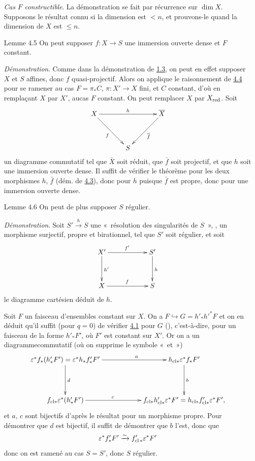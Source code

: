\documentclass[10pt]{../fichiers-configuration-latex/smfart}
\begin{document}
\medskip
\noindent
\emph{Cas $F$ constructible}. La démonstration se fait par récurrence
sur $\dim X$. Supposons le résultat connu si la dimension est $<n$, et
prouvons-le quand la dimension de $X$ est $\leq n$.

\begin{enonce*}{Lemme 4.5}
On peut supposer $f:X\rightarrow S$ une immersion ouverte dense et $F$
constant.
\end{enonce*}

\noindent
\emph{Démonstration}. Comme dans la démonstration de \hyperref[XVI.lem1.3]{1.3}, on peut en
effet supposer $X$ et $S$ affines, donc $f$ quasi-projectif. Alors on
applique le raisonnement de \hyperref[XVI.lem4.4]{4.4} pour se ramener au cas
$F=\pi_{\ast}C$, $\pi:X'\rightarrow X$ fini, et $C$ constant, d'où en
remplaçant $X$ par $X'$, au\pageoriginale cas $F$ constant. 
On peut remplacer $X$ par $X_{\operatorname{red}}$. Soit
$$
\xymatrix@=1.25cm{
  X  \ar[rr]^{h}\ar[rd]_{f} &      &\bar{X} \ar[ld]^{\bar{f}}\\
             &     S  &   
}
$$
un diagramme commutatif tel que $\bar{X}$ soit réduit, que $\bar{f}$
soit projectif, et que $h$ soit  une immersion ouverte dense. Il
suffit de vérifier le théorème pour les deux morphismes $h$, $\bar{f}$
(\cf dém. de \hyperref[XVI.lem4.3]{4.3}), donc pour $h$ puisque $\bar{f}$ est propre, donc
pour une immersion ouverte dense.

\begin{enonce*}{Lemme 4.6}
On peut de plus supposer $S$ régulier.
\end{enonce*}

\noindent
\emph{Démonstration}. Soit $S'\xrightarrow{h}S$ une « résolution
des singularités de $S$ », \ie, un morphisme surjectif, propre et
birationnel, tel que $S'$ soit régulier, et soit
$$
\xymatrix@C=2cm@R=1.25cm{
X'     \ar[r]^{f'} \ar[d]^{h'}&     S'\ar[d]^{h}\\
X   \ar[r]^{f}  & S
}
$$
le diagramme cartésien déduit de $h$.

Soit $F$ un faisceau d'ensembles constant sur $X$. On a
$F\hookrightarrow G=h'_{\ast}{h'}^{\ast}F$ et on en déduit qu'il
suffit (pour $q=0$) de vérifier \hyperref[XVI.thm4.1]{4.1} pour $G$ (\cf {}),
c'est-à-dire, pour un faisceau de la forme ${h'}_{\ast}F'$, où $F'$
est constant sur $X'$. Or on a un diagramme\pageoriginale commutatif
(où on supprime le symbole « et »)
$$
\xymatrix@C=2cm@R=1.5cm{
\varepsilon^{\ast}f_{\ast} (h'_{\ast}F') = \varepsilon^{\ast}h_{\ast}f'_{\ast}F'  \ar[d]^{d}\ar[r]^(.6){a} & h_{\text{cl}\ast}
	    \varepsilon^{\ast}f_{\ast}F' \ar[d]^{b}\\
	    f_{\text{cl}\ast}\varepsilon^{\ast}(h'_{\ast}F')  \ar[r]^(.4){c} &
	    f_{\text{cl}\ast} h'_{\text{cl}\ast}\varepsilon^{\ast}F' = h_{\text{cl}\ast}f'_{\text{cl}\ast}
	    \varepsilon^{\ast}F',
}
$$
et $a$, $c$ sont bijectifs d'après le résultat pour un morphisme
propre. Pour démontrer que $d$ est bijectif, il suffit de démontrer
que $b$ l'est, donc que
$$
\varepsilon^{\ast}f'_{\ast}F'\xrightarrow{\sim}
f'_{\operatorname{cl}\ast}\varepsilon^{\ast}F'
$$
donc on est ramené au cas $S=S'$, donc $S$ régulier.
\end{document}
